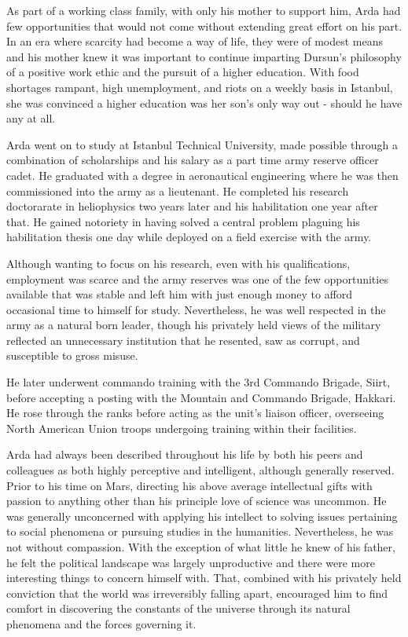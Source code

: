 As part of a working class family, with only his mother to support him, Arda had few opportunities that would not come without extending great effort on his part. In an era where scarcity had become a way of life, they were of modest means and his mother knew it was important to continue imparting Dursun's philosophy of a positive work ethic and the pursuit of a higher education. With food shortages rampant, high unemployment, and riots on a weekly basis in Istanbul, she was convinced a higher education was her son's only way out - should he have any at all.

Arda went on to study at Istanbul Technical University, made possible through a combination of scholarships and his salary as a part time army reserve officer cadet. He graduated with a degree in aeronautical engineering where he was then commissioned into the army as a lieutenant. He completed his research doctorarate in heliophysics two years later and his habilitation one year after that. He gained notoriety in having solved a central problem plaguing his habilitation thesis one day while deployed on a field exercise with the army.

Although wanting to focus on his research, even with his qualifications, employment was scarce and the army reserves was one of the few opportunities available that was stable and left him with just enough money to afford occasional time to himself for study. Nevertheless, he was well respected in the army as a natural born leader, though his privately held views of the military reflected an unnecessary institution that he resented, saw as corrupt, and susceptible to gross misuse.

He later underwent commando training with the 3rd Commando Brigade, Siirt, before accepting a posting with the Mountain and Commando Brigade, Hakkari. He rose through the ranks before acting as the unit's liaison officer, overseeing North American Union troops undergoing training within their facilities.

Arda had always been described throughout his life by both his peers and colleagues as both highly perceptive and intelligent, although generally reserved. Prior to his time on Mars, directing his above average intellectual gifts with passion to anything other than his principle love of science was uncommon. He was generally unconcerned with applying his intellect to solving issues pertaining to social phenomena or pursuing studies in the humanities. Nevertheless, he was not without compassion. With the exception of what little he knew of his father, he felt the political landscape was largely unproductive and there were more interesting things to concern himself with. That, combined with his privately held conviction that the world was irreversibly falling apart, encouraged him to find comfort in discovering the constants of the universe through its natural phenomena and the forces governing it.


